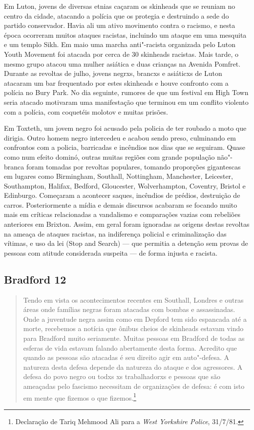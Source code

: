 Em Luton, jovens de diversas etnias caçaram os skinheads que se reuniam no centro da cidade, atacando a polícia que os protegia e destruindo a sede do partido conservador. Havia ali um ativo movimento contra o racismo, e nesta época ocorreram muitos ataques racistas, incluindo um ataque em uma mesquita e um templo Sikh. Em maio uma marcha anti"-racista organizada pelo Luton Youth Movement foi atacada por cerca de 30 skinheads racistas. Mais tarde, o mesmo grupo atacou uma mulher asiática e duas crianças na Avenida Pomfret. Durante as revoltas de julho, jovens negrxs, brancxs e asiáticxs de Luton atacaram um bar frequentado por estes skinheads e houve confronto com a polícia no Bury Park. No dia seguinte, rumores de que um festival em High Town seria atacado motivaram uma manifestação que terminou em um conflito violento com a polícia, com coquetéis molotov e muitas prisões.

Em Toxteth, um jovem negro foi acusado pela policia de ter roubado a moto que dirigia. Outro homem negro intercedeu e acabou sendo preso, culminando em confrontos com a policia, barricadas e incêndios nos dias que se seguiram. Quase como num efeito dominó, outras muitas regiões com grande população não"-branca foram tomadas por revoltas populares, tomando proporções gigantescas em lugares como Birmingham, Southall, Nottingham, Manchester, Leicester, Southampton, Halifax, Bedford, Gloucester, Wolverhampton, Coventry, Bristol e Edinburgo. Começaram a acontecer saques, incêndios de prédios, destruição de carros. Posteriormente a mídia e demais discursos acabaram se focando muito mais em críticas relacionadas a vandalismo e comparações vazias com rebeliões anteriores em Brixton. Assim, em geral foram ignoradas as origens destas revoltas na ameaça de ataques racistas, na indiferença policial e criminalização das vítimas, e uso da lei  (Stop and Search) --- que permitia a detenção sem provas de pessoas com atitude considerada suspeita --- de forma injusta e racista.

\subsection{Bradford 12}

\begin{quote}
Tendo em vista os acontecimentos recentes em Southall, Londres e outras áreas onde famílias negras foram atacadas com bombas e assassinadas. Onde a juventude negra assim como em Depford tem sido espancada até a morte, recebemos a notícia que ônibus cheios de skinheads estavam vindo para Bradford muito seriamente. Muitas pessoas em Bradford de todas as esferas de vida estavam falando abertamente desta forma. Acredito que quando as pessoas são atacadas é seu direito agir em auto"-defesa. A natureza desta defesa depende da natureza do ataque e dos agressores. A defesa do povo negro ou todxs xs trabalhadorxs e pessoas que são ameaçadas pelo fascismo necessitam de organizações de defesa: é com isto em mente que fizemos o que fizemos.\footnote{Declaração de Tariq Mehmood Ali para a \textit{West Yorkshire Police}, 31/7/81.}
\end{quote}


